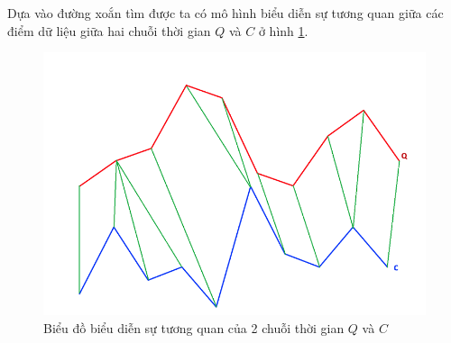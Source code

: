 \documentclass[13pt,oneside]{scrbook}
\begin{document}
Dựa vào đường xoắn tìm được ta có mô hình biểu diễn sự tương quan giữa các điểm dữ liệu giữa hai chuỗi thời gian $Q$ và $C$ ở hình \ref{TW_Q-C.png}.
\begin{figure}[H]
	\begin{center}
		\includegraphics[width=120mm]{DTW_Q-C.png}
		\caption{Biểu đồ biểu diễn sự tương quan của 2 chuỗi thời gian $Q$ và $C$}
		\label{TW_Q-C.png}
	\end{center}
\end{figure}
\end{document}
